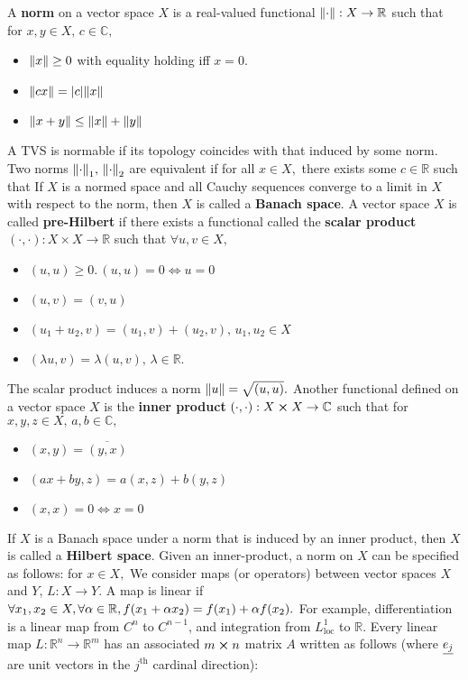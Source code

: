 A \textbf{norm} on a vector space $X$ is a real-valued functional $\norm{\cdot}:X\rightarrow\mathbb{R}$ such that for $x,y\in X,\,c\in\mathbb{C},$
\begin{itemize}
    \item $\norm{x}\geq0$ with equality holding iff $x=0.$
    \item $\norm{cx}=\abs{c}\norm{x}$
    \item $\norm{x+y}\leq\norm{x}+\norm{y}$
\end{itemize}
A TVS is normable if its topology coincides with that induced by some norm. Two norms $\norm{\cdot}_1 ,\,\norm{\cdot}_2$ are equivalent if for all $x\in X,$ there exists some $c\in\mathbb{R}$ such that
If $X$ is a normed space and all Cauchy sequences converge to a limit in $X$ with respect to the norm, then $X$ is called a \textbf{Banach space}. A vector space $X$ is called \textbf{pre-Hilbert} if there exists a functional called the \textbf{scalar product} $(\cdot,\cdot):X\times X\rightarrow\mathbb{R}$ such that $\forall u,v\in X,$
\begin{itemize}
    \item $(u,u)\geq 0.\,(u,u)=0\iff u=0$
    \item $(u,v)=(v,u)$
    \item $(u_1+u_2,v)=(u_1,v)+(u_2,v),\,u_1,u_2\in X$
    \item $(\lambda u,v)=\lambda(u,v),\,\lambda\in\mathbb{R}.$
\end{itemize}
The scalar product induces a norm $\norm{u}=\sqrt{(u,u)}.$ Another functional defined on a vector space $X$ is the \textbf{inner product} $(\cdot,\cdot):X\cross X\rightarrow \mathbb{C}$ such that for $x,y,z\in X,\, a,b\in\mathbb{C},$
\begin{itemize}
    \item $(x,y) = \overline{(y,x)}$
    \item $(ax+by,z) = a(x,z) + b(y,z)$
    \item $(x,x)=0\iff x=0$
\end{itemize}
If $X$ is a Banach space under a norm that is induced by an inner product, then $X$ is called a \textbf{Hilbert space}. Given an inner-product, a norm on $X$ can be specified as follows: for $x\in X,$
We consider maps (or operators) between vector spaces $X$ and $Y$, $L:X\rightarrow Y$. A map is linear if $\forall x_1,x_2\in X,\forall \alpha\in\mathbb{R},f(x_1+\alpha x_2)=f(x_1)+\alpha f(x_2).$ For example, differentiation is a linear map from $C^n$ to $C^{n-1}$, and integration from $L^1_\mathrm{loc}$ to $\mathbb{R}$. Every linear map $L:\mathbb{R}^n\rightarrow\mathbb{R}^m$ has an associated $m\cross n$ matrix $A$ written as follows (where $\underline{e_j}$ are unit vectors in the $j^\mathrm{th}$ cardinal direction):
